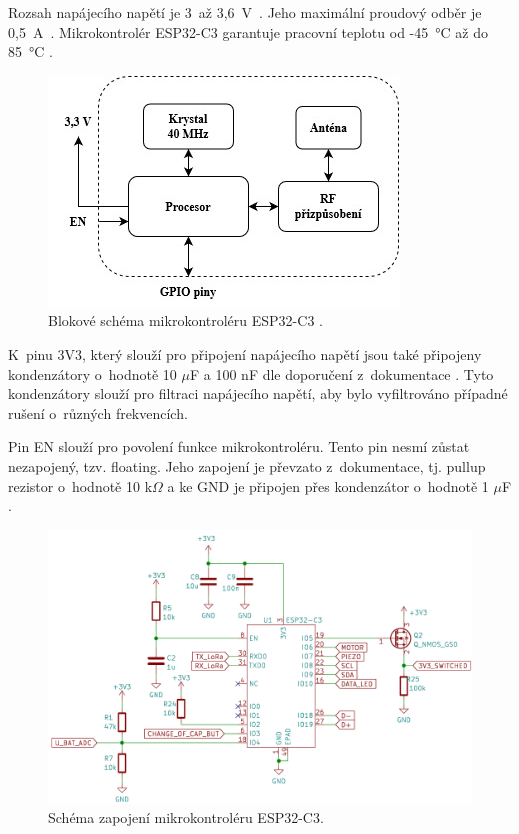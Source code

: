 Rozsah napájecího napětí je 3~až 3,6~V~\cite{ESP_C3_dtsh}. Jeho maximální proudový odběr je 0,5~A~\cite{ESP_C3_dtsh}. Mikrokontrolér ESP32-C3 garantuje pracovní teplotu 
od -45~°C až do 85~°C \cite{ESP_C3_dtsh}.

\begin{figure}[!h]
  \begin{center}
    \includegraphics[scale=0.8]{obrazky/blokove_schema_MCU.jpg}
  \end{center}
  \caption[Blokové schéma mikrokontroléru ESP32-C3]{Blokové schéma mikrokontroléru ESP32-C3 \cite{ESP_C3_dtsh}.}
\end{figure}

K~pinu 3V3, který slouží pro připojení napájecího napětí jsou také připojeny kondenzátory o~hodnotě 10 $\mu$F a 100 nF dle doporučení z~dokumentace \cite{ESP_C3_dtsh}. Tyto 
kondenzátory slouží pro filtraci napájecího napětí, aby bylo vyfiltrováno případné rušení o~různých frekvencích.

Pin EN slouží pro povolení funkce mikrokontroléru. Tento pin nesmí zůstat nezapojený, tzv. floating. Jeho zapojení je převzato z~dokumentace, tj. pullup rezistor o~hodnotě 
10 k$\Omega$ a ke GND je připojen přes kondenzátor o~hodnotě 1 $\mu$F \cite{ESP_C3_dtsh}.

\begin{figure}[!h]
  \begin{center}
    \includegraphics[scale=0.5]{obrazky/ESP32-C3.png}
  \end{center}
  \caption[Schéma zapojení mikrokontroléru ESP32-C3]{Schéma zapojení mikrokontroléru ESP32-C3.}
\end{figure}

